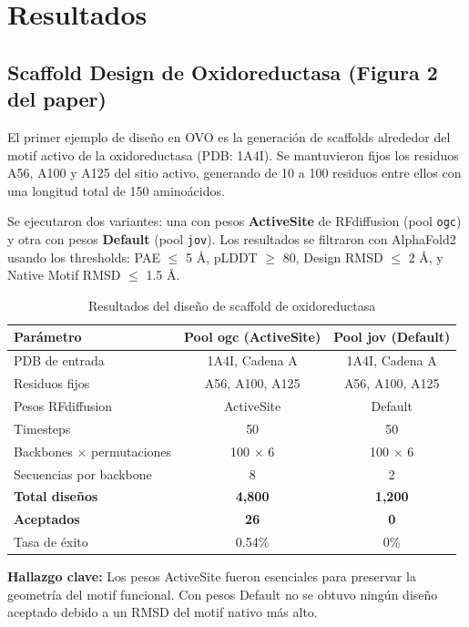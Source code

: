 \documentclass[10pt,a4paper,twocolumn]{article}
\begin{document}
\section{Resultados}

\subsection{Scaffold Design de Oxidoreductasa (Figura 2 del paper)}

El primer ejemplo de diseño en OVO es la generación de scaffolds alrededor del motif activo de la oxidoreductasa (PDB: 1A4I). Se mantuvieron fijos los residuos A56, A100 y A125 del sitio activo, generando de 10 a 100 residuos entre ellos con una longitud total de 150 aminoácidos.

Se ejecutaron dos variantes: una con pesos \textbf{ActiveSite} de RFdiffusion (pool \texttt{ogc}) y otra con pesos \textbf{Default} (pool \texttt{jov}). Los resultados se filtraron con AlphaFold2 usando los thresholds: PAE $\leq$ 5 \AA, pLDDT $\geq$ 80, Design RMSD $\leq$ 2 \AA, y Native Motif RMSD $\leq$ 1.5 \AA.

\begin{table}[hbt!]
\centering
\caption{Resultados del diseño de scaffold de oxidoreductasa}
\label{tab:oxidoreductase}
\begin{tabular}{lcc}
\toprule
\textbf{Parámetro} & \textbf{Pool ogc (ActiveSite)} & \textbf{Pool jov (Default)} \\
\midrule
PDB de entrada & 1A4I, Cadena A & 1A4I, Cadena A \\
Residuos fijos & A56, A100, A125 & A56, A100, A125 \\
Pesos RFdiffusion & ActiveSite & Default \\
Timesteps & 50 & 50 \\
Backbones $\times$ permutaciones & 100 $\times$ 6 & 100 $\times$ 6 \\
Secuencias por backbone & 8 & 2 \\
\textbf{Total diseños} & \textbf{4,800} & \textbf{1,200} \\
\textbf{Aceptados} & \textbf{26} & \textbf{0} \\
Tasa de éxito & 0.54\% & 0\% \\
\bottomrule
\end{tabular}
\end{table}

\textbf{Hallazgo clave:} Los pesos ActiveSite fueron esenciales para preservar la geometría del motif funcional. Con pesos Default no se obtuvo ningún diseño aceptado debido a un RMSD del motif nativo más alto.
\end{document}
